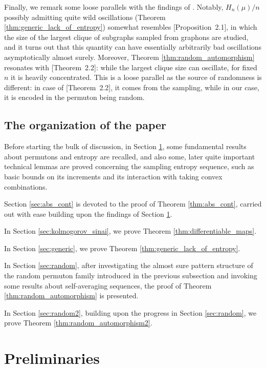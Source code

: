 \documentclass[11pt]{article}
\theoremstyle{definition}
\begin{document}
Finally, we remark some loose parallels with the findings of \cite{DHM2015}. Notably, $H_n(\mu)/n$ possibly admitting quite wild oscillations (Theorem \ref{thm:generic_lack_of_entropy}) somewhat resembles \cite{DHM2015}[Proposition~2.1], in which the size of the largest clique of subgraphs sampled from graphons are studied, and it turns out that this quantity can have essentially arbitrarily bad oscillations asymptotically almost surely. Moreover, 
Theorem \ref{thm:random_automorphism} resonates with \cite{DHM2015}[Theorem~2.2]: while the largest clique size can oscillate, for fixed $n$ it is heavily concentrated. This is a loose parallel as the source of randomness is different: in case of \cite{DHM2015}[Theorem~2.2], it comes from the sampling, while in our case, it is encoded in the permuton being random.

\subsection{The organization of the paper}

Before starting the bulk of discussion, in Section \ref{sec:prelim}, some fundamental results about permutons and entropy are recalled, and also some, later quite important technical lemmas are proved concerning the sampling entropy sequence, such as basic bounds on its increments and its interaction with taking convex combinations.

Section \ref{sec:abs_cont} is devoted to the proof of Theorem \ref{thm:abs_cont}, carried out with ease building upon the findings of Section \ref{sec:prelim}.

In Section \ref{sec:kolmogorov_sinai}, we prove Theorem \ref{thm:differentiable_maps}.

In Section \ref{sec:generic}, we prove Theorem \ref{thm:generic_lack_of_entropy}.

In Section \ref{sec:random}, after investigating the almost sure pattern structure of the random permuton family introduced in the previous subsection and invoking some results about self-averaging sequences, the proof of Theorem \ref{thm:random_automorphism} is presented.

In Section \ref{sec:random2}, building upon the progress in Section \ref{sec:random}, we prove Theorem \ref{thm:random_automorphism2}.

\section{Preliminaries} \label{sec:prelim}
\end{document}
